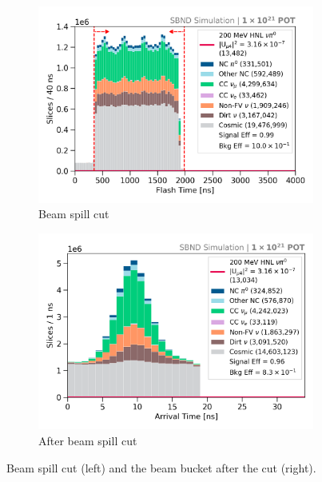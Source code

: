 \begin{figure}[ht!]
        \centering
        \begin{subfigure}[b]{0.495\textwidth}
            \centering
            \includegraphics[width=\textwidth]{beamspill}
            \caption{Beam spill cut}%
            \label{fig:beamspill_cut}
        \end{subfigure}
        \hfill
        \begin{subfigure}[b]{0.495\textwidth}  
            \centering 
            \includegraphics[width=\textwidth]{beam_bucket_post_beamspill}
            \caption{After beam spill cut}%
            \label{fig:bb_beamspill}
        \end{subfigure}
	\caption[Beam Spill Cut]{
		Beam spill cut (left) and the beam bucket after the cut (right). 
	}
        \label{fig:cosmic_bb_cut}
\end{figure}

